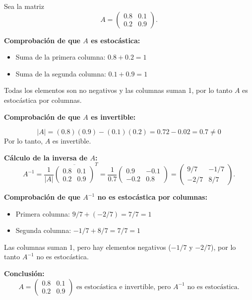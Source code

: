 \documentclass[a4paper,12pt]{article}
\begin{document}
\begin{ejercicio}[title=Ejercicio 43 (⋆)]
Sea la matriz
\[
A = \begin{pmatrix}
0.8 & 0.1 \\
0.2 & 0.9
\end{pmatrix}.
\]

\vspace{0.5em}

\textbf{Comprobación de que $A$ es estocástica:}  
\begin{itemize}
\item Suma de la primera columna: $0.8 + 0.2 = 1$  
\item Suma de la segunda columna: $0.1 + 0.9 = 1$  
\end{itemize}

Todas los elementos son no negativos y las columnas suman 1, por lo tanto $A$ es estocástica por columnas.

\vspace{0.5em}

\textbf{Comprobación de que $A$ es invertible:}  

\[
|A| = (0.8)(0.9) - (0.1)(0.2) = 0.72 - 0.02 = 0.7 \neq 0
\]
Por lo tanto, $A$ es invertible.
\end{ejercicio}
\begin{ejercicio}[title=Ejercicio 43 (⋆)]
\textbf{Cálculo de la inversa de $A$:}
\[
A^{-1} = \frac{1}{|A|} \overline{\begin{pmatrix} 0.8 & 0.1 \\ 0.2 & 0.9 \end{pmatrix}}^T = \frac{1}{0.7} \begin{pmatrix} 0.9 & -0.1 \\ -0.2 & 0.8 \end{pmatrix}
= \begin{pmatrix} 9/7 & -1/7 \\ -2/7 & 8/7 \end{pmatrix}.
\]

\vspace{0.5em}

\textbf{Comprobación de que $A^{-1}$ no es estocástica por columnas:}  
\begin{itemize}
\item Primera columna: $9/7 + (-2/7) = 7/7 = 1$ 
\item Segunda columna: $-1/7 + 8/7 = 7/7 = 1$  
\end{itemize}

Las columnas suman 1, pero hay elementos negativos ($-1/7$ y $-2/7$), por lo tanto $A^{-1}$ no es estocástica.

\vspace{0.5em}

\textbf{Conclusión:}  
\[
\boxed{A = \begin{pmatrix}
0.8 & 0.1 \\
0.2 & 0.9
\end{pmatrix}} \text{ es estocástica e invertible, pero } A^{-1} \text{ no es estocástica.}
\]

\end{ejercicio}
\end{document}
